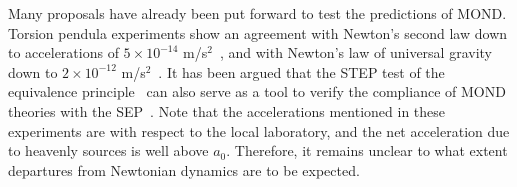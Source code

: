 \documentclass[aps,prl,reprint,superscriptaddress,nofootinbib,floatfix]{revtex4-2}
\begin{document}
Many proposals have already been put forward to test the predictions of MOND. Torsion pendula experiments show an agreement with Newton's second law down to accelerations of $5 \times 10^{-14}$ m/s$^2$~\cite{NewtonLaw-TorsionPend-Gundlach2007}, and with Newton's law of universal gravity down to $2 \times 10^{-12}$ m/s$^2$~\cite{TestNewton-Little2014}.
It has been argued that the STEP test of the equivalence principle~\cite{EquiPri-Worden1978} can also serve as a tool to verify the compliance of MOND theories with the SEP~\cite{MOND-SEPwSTEP-Pereira2016}.
Note that the accelerations mentioned in these experiments are with respect to the local laboratory, and the net acceleration due to heavenly sources is well above $a_0$. Therefore, it remains unclear to what extent departures from Newtonian dynamics are to be expected.



\end{document}
